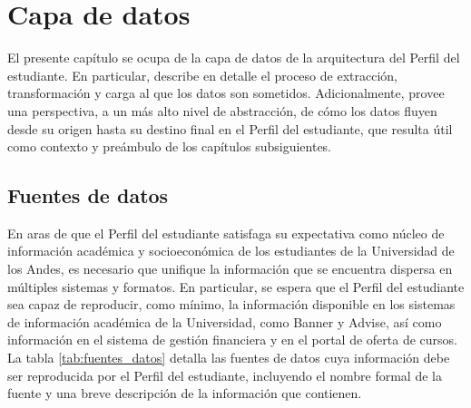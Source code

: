 \chapter{Capa de datos}

El presente capítulo se ocupa de la capa de datos de la arquitectura del Perfil del estudiante. En particular, describe en detalle el proceso de extracción, transformación y carga al que los datos son sometidos. Adicionalmente, provee una perspectiva, a un más alto nivel de abstracción, de cómo los datos fluyen desde su origen hasta su destino final en el Perfil del estudiante, que resulta útil como contexto y preámbulo de los capítulos subsiguientes.

\section{Fuentes de datos}

En aras de que el Perfil del estudiante satisfaga su expectativa como núcleo de información académica y socioeconómica de los estudiantes de la Universidad de los Andes, es necesario que unifique la información que se encuentra dispersa en múltiples sistemas y formatos. En particular, se espera que el Perfil del estudiante sea capaz de reproducir, como mínimo, la información disponible en los sistemas de información académica de la Universidad, como Banner y Advise, así como información en el sistema de gestión financiera y en el portal de oferta de cursos. La tabla \ref{tab:fuentes_datos} detalla las fuentes de datos cuya información debe ser reproducida por el Perfil del estudiante, incluyendo el nombre formal de la fuente y una breve descripción de la información que contienen.

